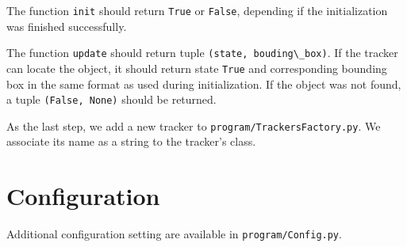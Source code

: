 The function \verb+init+ should return \verb+True+ or \verb+False+, depending
if the initialization was finished successfully.

The function \verb+update+ should return tuple \verb+(state, bouding\_box)+.
If the tracker can locate the object, it should return state \verb+True+ and corresponding bounding box in the same format as used during
initialization. If the object was not found, a tuple \verb+(False, None)+
should be returned.

As the last step, we add a new tracker to \verb+program/TrackersFactory.py+.
We associate its name as a string to the tracker's class. 

\section{Configuration}

Additional configuration setting are available in \verb+program/Config.py+.
